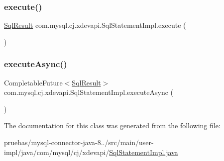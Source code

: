 \subsubsection{\texorpdfstring{execute()}{execute()}}
{\footnotesize\ttfamily \mbox{\hyperlink{interfacecom_1_1mysql_1_1cj_1_1xdevapi_1_1_sql_result}{Sql\+Result}} com.\+mysql.\+cj.\+xdevapi.\+Sql\+Statement\+Impl.\+execute (\begin{DoxyParamCaption}{ }\end{DoxyParamCaption})}

\mbox{\label{classcom_1_1mysql_1_1cj_1_1xdevapi_1_1_sql_statement_impl_aa041eeb7c8c37ed627555fdd1efd02a7}} 
\subsubsection{\texorpdfstring{execute\+Async()}{executeAsync()}}
{\footnotesize\ttfamily Completable\+Future$<$\mbox{\hyperlink{interfacecom_1_1mysql_1_1cj_1_1xdevapi_1_1_sql_result}{Sql\+Result}}$>$ com.\+mysql.\+cj.\+xdevapi.\+Sql\+Statement\+Impl.\+execute\+Async (\begin{DoxyParamCaption}{ }\end{DoxyParamCaption})}



The documentation for this class was generated from the following file\+:\begin{DoxyCompactItemize}
\item 
pruebas/mysql-\/connector-\/java-\/8../src/main/user-\/impl/java/com/mysql/cj/xdevapi/\mbox{\hyperlink{_sql_statement_impl_8java}{Sql\+Statement\+Impl.\+java}}\end{DoxyCompactItemize}
